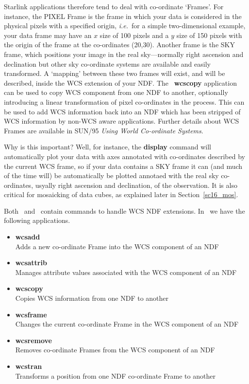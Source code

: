 \documentclass[twoside,11pt]{article}
\newcommand{\htmlref}[2]{#1}
\newcommand{\latex}[1]{#1}
\newcommand{\xref}[3]{#1}
\begin{document}
{Starlink applications therefore tend to deal with co-ordinate
`Frames'.  For instance, the PIXEL Frame is the frame in which your
data is considered in the physical pixels with a specified origin,
\emph{i.e.}\ for a simple two-dimensional example, your data frame may
have an $x$ size of 100 pixels and a $y$ size of 150 pixels with the
origin of the frame at the co-ordinates (20,30).  Another frame is the
SKY frame, which positions your image in the real sky---normally
right ascension and declination but other sky co-ordinate systems are
available and easily transformed.  A `mapping' between these two
frames will exist, and will be described, inside the WCS extension of
your NDF.  The \KAPPA\ \xref{{\bf wcscopy}}{sun95}{WCSCOPY} application can
be used to copy WCS component from one NDF to another, optionally
introducing a linear transformation of pixel co-ordinates in the
process.  This can be used to add WCS information back into an NDF
which has been stripped of WCS information by non-WCS aware
applications.  Further details about \xref{WCS Frames}{sun95}{se_resdoms} 
are available \latex{in SUN/95 {\em Using World Co-ordinate
Systems}}.

Why is this important?  Well, for instance, the
\xref{{\bf display}}{sun95}{DISPLAY} command will automatically plot your
data with axes annotated with co-ordinates described by the current
WCS frame, so if your data contains a SKY frame it can (and much of
the time will) be automatically be plotted annotaed with the real sky
co-ordinates, usyally right ascension and declination, of the
observation.  It is also critical for mosaicking of data cubes, as
explained \htmlref{later}{sc16_mos}\latex{ in Section~\ref{sc16_mos}}.

Both \KAPPAref\ and \CCDPACKref\ contain commands to handle WCS NDF
extensions.  In \KAPPA\ we have the following applications.

\begin{itemize}  
\item{\xref{{\bf wcsadd}}{sun95}{WCSADD}}\\
Adds a new co-ordinate Frame into the WCS component of an NDF 
\item{\xref{{\bf wcsattrib}}{sun95}{WCSATTRIB}}\\
Manages attribute values associated with the WCS component of an NDF
\item{\xref{{\bf wcscopy}}{sun95}{WCSCOPY}}\\ 
Copies WCS information from one NDF to another 
\item{\xref{{\bf wcsframe}}{sun95}{WCSFRAME}}\\ 
Changes the current co-ordinate Frame in the WCS component of an NDF 
\item{\xref{{\bf wcsremove}}{sun95}{WCSREMOVE}}\\
Removes co-ordinate Frames from the WCS component of an NDF 
\item{\xref{{\bf wcstran}}{sun95}{WCSTRAN}}\\
Transforms a position from one NDF co-ordinate Frame to another 
\end{itemize}

}
\end{document}
